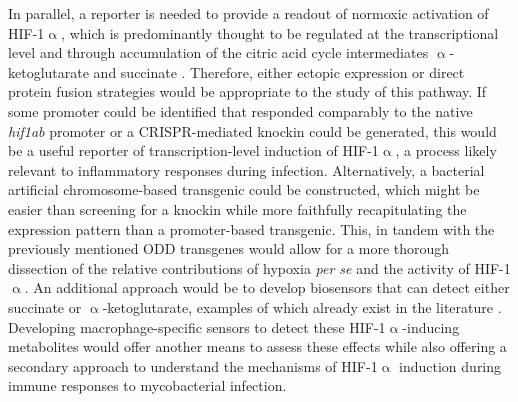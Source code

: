 In parallel, a reporter is needed to provide a readout of normoxic activation of HIF\hyp{}1$\upalpha$, which is predominantly thought to be regulated at the transcriptional level and through accumulation of the citric acid cycle intermediates $\upalpha$\hyp{}ketoglutarate and succinate \citep{Tannahill2013, Palazon2014, Meng2018, Williams2018}. Therefore, either ectopic expression or direct protein fusion strategies would be appropriate to the study of this pathway. If some promoter could be identified that responded comparably to the native \textit{hif1ab} promoter or a CRISPR\hyp{}mediated knockin could be generated, this would be a useful reporter of transcription\hyp{}level induction of HIF\hyp{}1$\upalpha$, a process likely relevant to inflammatory responses during infection. Alternatively, a bacterial artificial chromosome\hyp{}based transgenic could be constructed, which might be easier than screening for a knockin while more faithfully recapitulating the expression pattern than a promoter\hyp{}based transgenic. This, in tandem with the previously mentioned ODD transgenes would allow for a more thorough dissection of the relative contributions of hypoxia \textit{per se} and the activity of HIF\hyp{}1$\upalpha$. An additional approach would be to develop biosensors that can detect either succinate or $\upalpha$\hyp{}ketoglutarate, examples of which already exist in the literature \citep{Liu2017b, Luddecke2017, Suzuki2021}. Developing macrophage\hyp{}specific sensors to detect these HIF\hyp{}1$\upalpha$\hyp{}inducing metabolites would offer another means to assess these effects while also offering a secondary approach to understand the mechanisms of HIF\hyp{}1$\upalpha$ induction during immune responses to mycobacterial infection. 

